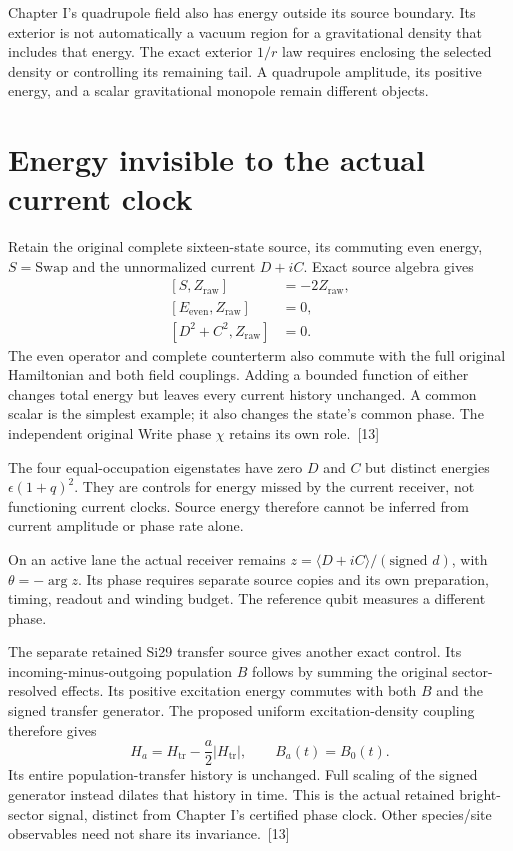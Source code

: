 \documentclass[10pt,twocolumn,letterpaper]{article}
\begin{document}
Chapter I's quadrupole field also has energy outside its source boundary. Its exterior is not automatically a vacuum region for a gravitational density that includes that energy. The exact exterior $1/r$ law requires enclosing the selected density or controlling its remaining tail. A quadrupole amplitude, its positive energy, and a scalar gravitational monopole remain different objects.

\section{Energy invisible to the actual current clock}
Retain the original complete sixteen-state source, its commuting even energy, \(S=\mathrm{Swap}\) and the unnormalized current \(D+iC\). Exact source algebra gives
\[
\begin{aligned}
[S,Z_{\mathrm{raw}}]&=-2Z_{\mathrm{raw}},\\
[E_{\mathrm{even}},Z_{\mathrm{raw}}]&=0,\\
[D^2+C^2,Z_{\mathrm{raw}}]&=0.
\end{aligned}
\]
The even operator and complete counterterm also commute with the full original Hamiltonian and both field couplings. Adding a bounded function of either changes total energy but leaves every current history unchanged. A common scalar is the simplest example; it also changes the state's common phase. The independent original Write phase \(\chi\) retains its own role.~[13]

The four equal-occupation eigenstates have zero \(D\) and \(C\) but distinct energies \(\epsilon(1+q)^2\). They are controls for energy missed by the current receiver, not functioning current clocks. Source energy therefore cannot be inferred from current amplitude or phase rate alone.

On an active lane the actual receiver remains \(z=\langle D+iC\rangle/(\text{signed }d)\), with \(\theta=-\arg z\). Its phase requires separate source copies and its own preparation, timing, readout and winding budget. The reference qubit measures a different phase.

The separate retained Si29 transfer source gives another exact control. Its incoming-minus-outgoing population \(B\) follows by summing the original sector-resolved effects. Its positive excitation energy commutes with both \(B\) and the signed transfer generator. The proposed uniform excitation-density coupling therefore gives
\[
H_a=H_{\mathrm{tr}}-\frac{a}{2}|H_{\mathrm{tr}}|,
\qquad B_a(t)=B_0(t).
\]
Its entire population-transfer history is unchanged. Full scaling of the signed generator instead dilates that history in time. This is the actual retained bright-sector signal, distinct from Chapter I's certified phase clock. Other species/site observables need not share its invariance.~[13]
\end{document}

